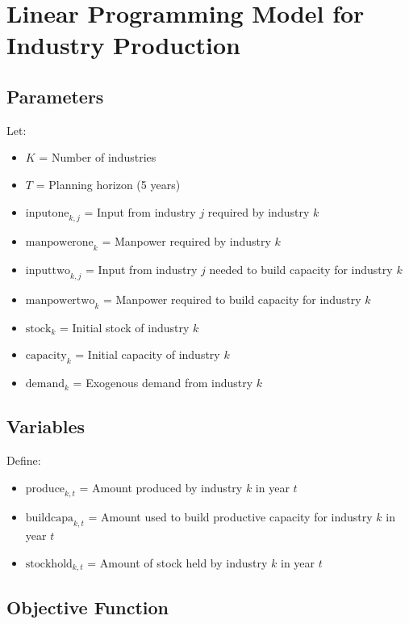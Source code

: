 \documentclass{article}
\begin{document}
\section*{Linear Programming Model for Industry Production}

\subsection*{Parameters}

Let:
\begin{itemize}
    \item \( K \) = Number of industries 
    \item \( T \) = Planning horizon (5 years)
    \item \( \text{inputone}_{k,j} \) = Input from industry \( j \) required by industry \( k \)
    \item \( \text{manpowerone}_{k} \) = Manpower required by industry \( k \)
    \item \( \text{inputtwo}_{k,j} \) = Input from industry \( j \) needed to build capacity for industry \( k \)
    \item \( \text{manpowertwo}_{k} \) = Manpower required to build capacity for industry \( k \)
    \item \( \text{stock}_{k} \) = Initial stock of industry \( k \)
    \item \( \text{capacity}_{k} \) = Initial capacity of industry \( k \)
    \item \( \text{demand}_{k} \) = Exogenous demand from industry \( k \)
\end{itemize}

\subsection*{Variables}

Define:
\begin{itemize}
    \item \( \text{produce}_{k,t} \) = Amount produced by industry \( k \) in year \( t \)
    \item \( \text{buildcapa}_{k,t} \) = Amount used to build productive capacity for industry \( k \) in year \( t \)
    \item \( \text{stockhold}_{k,t} \) = Amount of stock held by industry \( k \) in year \( t \)
\end{itemize}

\subsection*{Objective Function}
\end{document}
